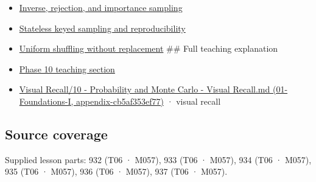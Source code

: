 \begin{itemize}
\item
  \hyperref[appendix-8d863ed954d0]{Inverse, rejection, and importance sampling}
\item
  \hyperref[appendix-daaf25bfd3a0]{Stateless keyed sampling and reproducibility}
\item
  \hyperref[appendix-184fcc411663]{Uniform shuffling without replacement} \#\# Full teaching explanation
\item
  \href{Continuous\%20Notes/Computing\%20Foundations\%20-\%20From\%20Bits\%20to\%20C++\%20and\%20Systems\%20APIs\#6.\%20A\%20computer\%20produces\%20deterministic\%20pseudorandom\%20sequences}{Phase 10 teaching section}
\item
  \href{}{Visual Recall/10 - Probability and Monte Carlo - Visual Recall.md (01-Foundations-I, appendix-cb5af353ef77)} · visual recall
\end{itemize}

\subsection{Source coverage}\label{source-coverage}

Supplied lesson parts: 932 (T06 · M057), 933 (T06 · M057), 934 (T06 · M057), 935 (T06 · M057), 936 (T06 · M057), 937 (T06 · M057).
